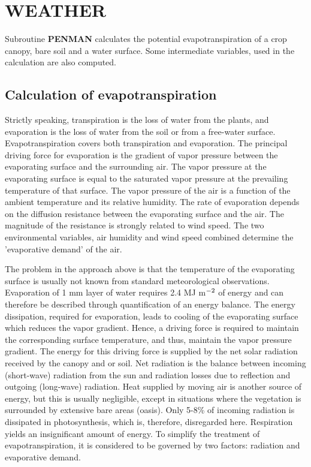 \chapter{WEATHER}

Subroutine {\bf PENMAN} calculates the potential evapotranspiration of a crop canopy, bare
soil and a water surface. Some intermediate variables, used in the calculation are also
computed.

\section{Calculation of evapotranspiration}

Strictly speaking, transpiration is the loss of water from the plants, and evaporation is the
loss of water from the soil or from a free-water surface. Evapotranspiration covers both
transpiration and evaporation.
The principal driving force for evaporation is the gradient of vapor pressure between the
evaporating surface and the surrounding air. The vapor pressure at the evaporating
surface is equal to the saturated vapor pressure at the prevailing temperature of that
surface. The vapor pressure of the air is a function of the ambient temperature and its
relative humidity. The rate of evaporation depends on the diffusion resistance between the
evaporating surface and the air.
The magnitude of the resistance is strongly related to wind speed. The two environ\-mental
variables, air humidity and wind speed combined determine the 'evaporative demand' of
the air.

The problem in the approach above is that the temperature of the evaporating surface is
usually not known from standard meteorological observations. Evaporation  of 1 mm
layer of water requires 2.4 MJ m$^{{\rm -2}}$ of energy and can therefore be described through
quantification of an energy balance. The energy dissipation, required for evaporation,
leads to cooling of the evaporating surface which reduces the vapor gradient. Hence, a
driving force is required to maintain the corresponding surface temperature, and thus,
maintain the vapor pres\-sure gradient. The energy for this driving force is supplied by the
net solar radiation received by the canopy and or soil.
Net radiation is the balance between incoming (short-wave) radiation from the sun and
radiation losses due to reflection and outgoing (long-wave) radiation. Heat supplied by
moving air is another source of energy, but this is usually negligible, except in situations
where the vegetation is surrounded by extensive bare areas (oasis). Only 5-8\% of
incoming radiation is dissipated in photosynthesis, which is, therefore, disregarded here.
Respiration yields an insignificant amount of energy. To simplify the treatment of
evapotranspiration, it is considered to be governed by two factors: radiation and evaporative demand.

